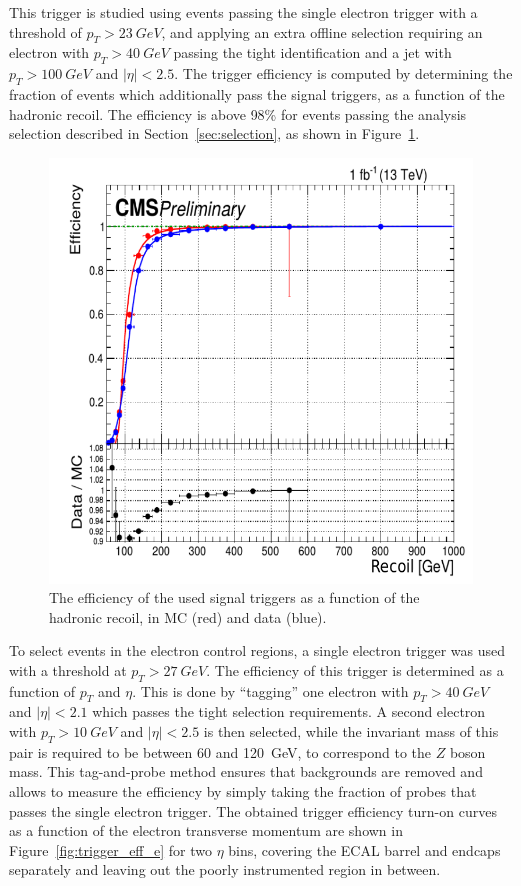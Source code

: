 This trigger is studied using events passing the single electron trigger with a threshold of $p_T > \SI{23}{GeV}$, and applying an extra offline selection requiring an electron with $p_T > \SI{40}{GeV}$ passing the tight identification and a jet with $p_T > \SI{100}{GeV}$ and $|\eta| < 2.5$. The trigger efficiency is computed by determining the fraction of events which additionally pass the signal triggers, as a function of the hadronic recoil. The efficiency is above 98\% for events passing the analysis selection described in Section~\ref{sec:selection}, as shown in Figure~\ref{fig:trigger_eff}.

\begin{figure}[ht]
  \centering
 \includegraphics[width=.61\textwidth]{monojet_trigger.png} 
 \caption{The efficiency of the used signal triggers as a function of the hadronic recoil, in MC (red) and data (blue).}
 \label{fig:trigger_eff}
\end{figure}

To select events in the electron control regions, a single electron trigger was used with a threshold at $p_T > \SI{27}{GeV}$. The efficiency of this trigger is determined as a function of $p_T$ and $\eta$. This is done by ``tagging'' one electron with $p_T > \SI{40}{GeV}$ and $|\eta| < 2.1$ which passes the tight selection requirements. A second electron with $p_T > \SI{10}{GeV}$ and $|\eta| < 2.5$ is then selected, while the invariant mass of this pair is required to be between 60 and \SI{120}{GeV}, to correspond to the $Z$ boson mass. This tag-and-probe method ensures that backgrounds are removed and allows to measure the efficiency by simply taking the fraction of probes that passes the single electron trigger. The obtained trigger efficiency turn-on curves as a function of the electron transverse momentum are shown in Figure~\ref{fig:trigger_eff_e} for two $\eta$ bins, covering the \ac{ECAL} barrel and endcaps separately and leaving out the poorly instrumented region in between.

